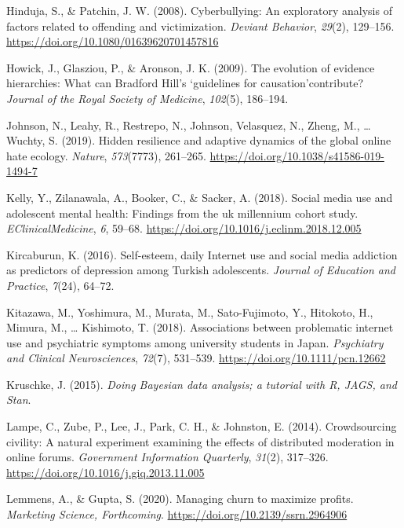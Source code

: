 \documentclass[10pt,dvipsnames]{scrartcl}
\begin{document}
\hypertarget{ref-hinduja2008cyberbullying}{}
Hinduja, S., \& Patchin, J. W. (2008). Cyberbullying: An exploratory
analysis of factors related to offending and victimization.
\emph{Deviant Behavior}, \emph{29}(2), 129--156.
\url{https://doi.org/10.1080/01639620701457816}

\hypertarget{ref-howick2009evolution}{}
Howick, J., Glasziou, P., \& Aronson, J. K. (2009). The evolution of
evidence hierarchies: What can Bradford Hill's `guidelines for
causation'contribute? \emph{Journal of the Royal Society of Medicine},
\emph{102}(5), 186--194.

\hypertarget{ref-johnson2019hidden}{}
Johnson, N., Leahy, R., Restrepo, N., Johnson, Velasquez, N., Zheng, M.,
\ldots{} Wuchty, S. (2019). Hidden resilience and adaptive dynamics of
the global online hate ecology. \emph{Nature}, \emph{573}(7773),
261--265. \url{https://doi.org/10.1038/s41586-019-1494-7}

\hypertarget{ref-kelly2018social}{}
Kelly, Y., Zilanawala, A., Booker, C., \& Sacker, A. (2018). Social
media use and adolescent mental health: Findings from the uk millennium
cohort study. \emph{EClinicalMedicine}, \emph{6}, 59--68.
\url{https://doi.org/10.1016/j.eclinm.2018.12.005}

\hypertarget{ref-kircaburun2016self}{}
Kircaburun, K. (2016). Self-esteem, daily Internet use and social media
addiction as predictors of depression among Turkish adolescents.
\emph{Journal of Education and Practice}, \emph{7}(24), 64--72.

\hypertarget{ref-kitazawa2018associations}{}
Kitazawa, M., Yoshimura, M., Murata, M., Sato-Fujimoto, Y., Hitokoto,
H., Mimura, M., \ldots{} Kishimoto, T. (2018). Associations between
problematic internet use and psychiatric symptoms among university
students in Japan. \emph{Psychiatry and Clinical Neurosciences},
\emph{72}(7), 531--539. \url{https://doi.org/10.1111/pcn.12662}

\hypertarget{ref-Kruschke2015}{}
Kruschke, J. (2015). \emph{Doing Bayesian data analysis; a tutorial with
R, JAGS, and Stan}.

\hypertarget{ref-lampe2014crowdsourcing}{}
Lampe, C., Zube, P., Lee, J., Park, C. H., \& Johnston, E. (2014).
Crowdsourcing civility: A natural experiment examining the effects of
distributed moderation in online forums. \emph{Government Information
Quarterly}, \emph{31}(2), 317--326.
\url{https://doi.org/10.1016/j.giq.2013.11.005}

\hypertarget{ref-lemmens2020managing}{}
Lemmens, A., \& Gupta, S. (2020). Managing churn to maximize profits.
\emph{Marketing Science, Forthcoming}.
\url{https://doi.org/10.2139/ssrn.2964906}
\end{document}
